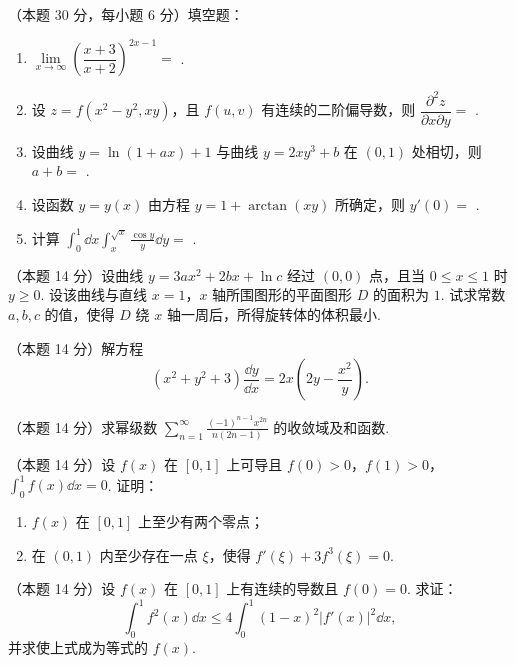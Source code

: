 
\begin{problems}
\item[一、]（本题 30 分，每小题 6 分）填空题：
\begin{enumerate}
\item $\lim\limits_{x\to\infty}\left(\dfrac{x+3}{x+2}\right)^{2x-1}=$ \underline{\hspace{6em}}.
\item 设 $z=f(x^2-y^2,xy)$，且 $f(u,v)$ 有连续的二阶偏导数，则 $\dfrac{\partial^2 z}{\partial x\partial y}=$ \underline{\hspace{6em}}.
\item 设曲线 $y=\ln(1+ax)+1$ 与曲线 $y=2xy^3+b$ 在 $(0,1)$ 处相切，则 $a+b=$ \underline{\hspace{6em}}.
\item 设函数 $y=y(x)$ 由方程 $y=1+\arctan(xy)$ 所确定，则 $y'(0)=$ \underline{\hspace{6em}}.
\item 计算 $\displaystyle\int_0^1 \dd x\int_x^{\sqrt{x}}\frac{\cos y}{y}\dd y=$ \underline{\hspace{6em}}.
\end{enumerate}
\item[二、]（本题 14 分）设曲线 $y=3ax^2+2bx+\ln c$ 经过 $(0,0)$ 点，且当 $0\le x\le 1$ 时 $y\ge 0$. 设该曲线与直线 $x=1$，$x$ 轴所围图形的平面图形 $D$ 的面积为 $1$. 试求常数 $a,b,c$ 的值，使得 $D$ 绕 $x$ 轴一周后，所得旋转体的体积最小.
\item[三、]（本题 14 分）解方程
\[ (x^2+y^2+3)\frac{\dd y}{\dd x}=2x\left(2y-\frac{x^2}{y}\right). \]
\item[四、]（本题 14 分）求幂级数 $\displaystyle\sum_{n=1}^{\infty}\frac{(-1)^{n-1}x^{2n}}{n(2n-1)}$ 的收敛域及和函数.
\item[五、]（本题 14 分）设 $f(x)$ 在 $[0,1]$ 上可导且 $f(0)>0$，$f(1)>0$，$\displaystyle\int_0^1 f(x)\dd x=0$. 证明：
\begin{enumerate}
\item $f(x)$ 在 $[0,1]$ 上至少有两个零点；
\item 在 $(0,1)$ 内至少存在一点 $\xi$，使得 $f'(\xi)+3f^3(\xi)=0$.
\end{enumerate}
\item[六、]（本题 14 分）设 $f(x)$ 在 $[0,1]$ 上有连续的导数且 $f(0)=0$. 求证：
\[ \int_0^1 f^2(x)\dd x\le 4\int_0^1 (1-x)^2|f'(x)|^2\dd x, \]
并求使上式成为等式的 $f(x)$.
\end{problems}
